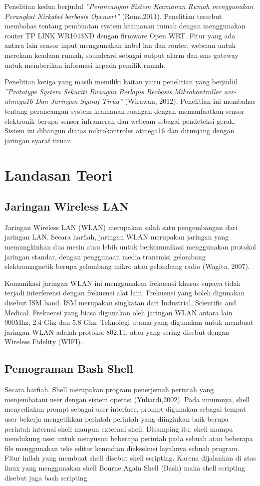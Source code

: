 \documentclass{jtetiproposalskripsi}
\begin{document}
Penelitian kedua berjudul \emph{''Perancangan Sistem Keamanan Rumah menggunakan Perangkat Nirkabel berbasis Openwrt''} (Romi,2011). Penelitian tersebut membahas tentang pembuatan system keamanan rumah dengan menggunakan router TP LINK WR1043ND dengan firmware Open WRT. Fitur yang ada antara lain sensor input menggunakan kabel lan dan router, webcam untuk merekam keadaan rumah, soundcard sebagai output alarm dan sms gateway untuk memberikan informasi kepada pemilik rumah. 

Penelitian ketiga yang masih memiliki kaitan yaitu penelitian yang berjudul \emph{''Prototype System Sekuriti Ruangan Berlapis Berbasis Mikrokontroller avr-atmega16 Dan Jaringan Syaraf Tirua''} (Wirawan, 2012). Penelitian ini membahas tentang perancangan system keamanan ruangan dengan memanfaatkan sensor elektronik berupa sensor inframerah dan webcam sebagai pendeteksi gerak. Sistem ini dibangun diatas mikrokontroler atmega16 dan ditunjang dengan jaringan syaraf tiruan.  

\section{Landasan Teori}
\subsection{Jaringan Wireless LAN }
Jaringan Wireless LAN (WLAN) merupakan salah satu pengembangan dari jaringan LAN. Secara harfiah, jaringan WLAN merupakan jaringan yang memungkinkan dua mesin atau lebih untuk berkomunikasi menggunakan protokol jaringan standar, dengan penggunaan media transmisi gelombang elektromagnetik berupa gelombang mikro atau gelombang radio (Wagito, 2007).

Komunikasi jaringan WLAN ini menggunakan frekuensi khusus supaya tidak terjadi interferensi dengan frekuensi alat lain. Frekuensi yang boleh digunakan disebut ISM band. ISM merupakan singkatan dari Industrial, Scientific and Medical. Frekuensi yang biasa digunakan oleh jaringan WLAN antara lain 900Mhz, 2.4 Ghz dan 5.8 Ghz. Teknologi utama yang digunakan untuk membuat jaringan WLAN adalah protokol 802.11, atau yang sering disebut dengan Wireless Fidelity (WIFI).


\subsection{Pemograman Bash Shell}
Secara harfiah, Shell merupakan program penerjemah perintah yang menjembatani user dengan sistem operasi (Yuliardi,2002). Pada umumnya, shell menyediakan prompt sebagai user interface, prompt digunakan sebagai tempat user bekerja mengetikkan perintah-perintah yang diinginkan baik berupa perintah internal shell maupun external shell. Disamping itu, shell mampu mendukung user untuk menyusun beberapa perintah pada sebuah atau beberapa file menggunakan teks editor kemudian dieksekusi layaknya sebuah program. Fitur inilah yang membuat shell disebut shell scripting. Karena dijalankan di atas linux yang menggunakan shell Bourne Again Shell (Bash) maka shell scripting disebut juga bash scripting.
\end{document}
